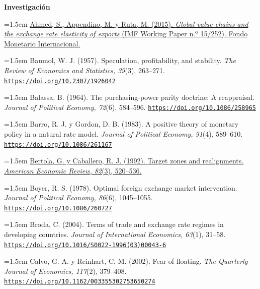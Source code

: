 \documentclass[10pt,a4paper]{article}
\begin{document}
\bigskip
{\bfseries\large Investigación\par}
\medskip

\noindent\hangindent=1.5em \href{https://www.imf.org/en/Publications/WP/Issues/2016/12/31/Global-Value-Chains-and-the-Exchange-Rate-Elasticity-of-Exports-43424}{Ahmed, S., Appendino, M. y Ruta, M. (2015). \textit{Global value chains and the exchange rate elasticity of exports} (IMF Working Paper n.º 15/252). Fondo Monetario Internacional.}

\noindent\hangindent=1.5em Baumol, W. J. (1957). Speculation, profitability, and stability. \textit{The Review of Economics and Statistics, 39}(3), 263--271. \href{https://doi.org/10.2307/1926042}{\nolinkurl{https://doi.org/10.2307/1926042}}

\noindent\hangindent=1.5em Balassa, B. (1964). The purchasing-power parity doctrine: A reappraisal. \textit{Journal of Political Economy, 72}(6), 584--596. \href{https://doi.org/10.1086/258965}{\nolinkurl{https://doi.org/10.1086/258965}}

\noindent\hangindent=1.5em Barro, R. J. y Gordon, D. B. (1983). A positive theory of monetary policy in a natural rate model. \textit{Journal of Political Economy, 91}(4), 589--610. \href{https://doi.org/10.1086/261167}{\nolinkurl{https://doi.org/10.1086/261167}}

\noindent\hangindent=1.5em \href{https://ideas.repec.org/a/aea/aecrev/v82y1992i3p520-36.html}{Bertola, G. y Caballero, R. J. (1992). Target zones and realignments. \textit{American Economic Review, 82}(3), 520--536.}

\noindent\hangindent=1.5em Boyer, R. S. (1978). Optimal foreign exchange market intervention. \textit{Journal of Political Economy, 86}(6), 1045--1055. \href{https://doi.org/10.1086/260727}{\nolinkurl{https://doi.org/10.1086/260727}}

\noindent\hangindent=1.5em Broda, C. (2004). Terms of trade and exchange rate regimes in developing countries. \textit{Journal of International Economics, 63}(1), 31--58. \href{https://doi.org/10.1016/S0022-1996(03)00043-6}{\nolinkurl{https://doi.org/10.1016/S0022-1996(03)00043-6}}

\noindent\hangindent=1.5em Calvo, G. A. y Reinhart, C. M. (2002). Fear of floating. \textit{The Quarterly Journal of Economics, 117}(2), 379--408. \href{https://doi.org/10.1162/003355302753650274}{\nolinkurl{https://doi.org/10.1162/003355302753650274}}
\end{document}
